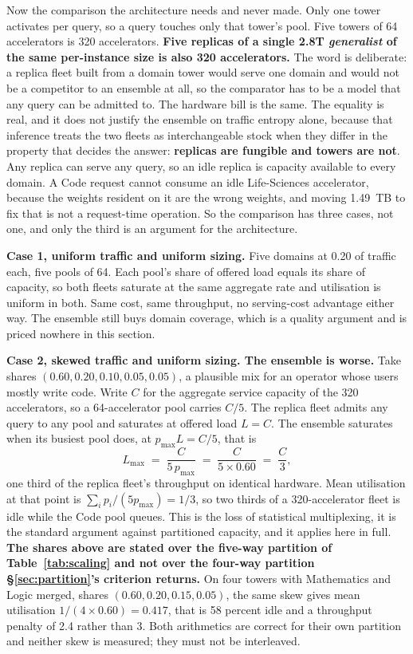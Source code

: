 \documentclass[11pt]{article}
\begin{document}
Now the comparison the architecture needs and never made. Only one tower activates per query, so a query touches only that tower's pool. Five towers of 64 accelerators is 320 accelerators. \textbf{Five replicas of a single 2.8T \emph{generalist} of the same per-instance size is also 320 accelerators.} The word is deliberate: a replica fleet built from a domain tower would serve one domain and would not be a competitor to an ensemble at all, so the comparator has to be a model that any query can be admitted to. The hardware bill is the same. The equality is real, and it does not justify the ensemble on traffic entropy alone, because that inference treats the two fleets as interchangeable stock when they differ in the property that decides the answer: \textbf{replicas are fungible and towers are not}. Any replica can serve any query, so an idle replica is capacity available to every domain. A Code request cannot consume an idle Life-Sciences accelerator, because the weights resident on it are the wrong weights, and moving 1.49~TB to fix that is not a request-time operation. So the comparison has three cases, not one, and only the third is an argument for the architecture.

\textbf{Case 1, uniform traffic and uniform sizing.} Five domains at 0.20 of traffic each, five pools of 64. Each pool's share of offered load equals its share of capacity, so both fleets saturate at the same aggregate rate and utilisation is uniform in both. Same cost, same throughput, no serving-cost advantage either way. The ensemble still buys domain coverage, which is a quality argument and is priced nowhere in this section.

\textbf{Case 2, skewed traffic and uniform sizing. The ensemble is worse.} Take shares $(0.60, 0.20, 0.10, 0.05, 0.05)$, a plausible mix for an operator whose users mostly write code. Write $C$ for the aggregate service capacity of the 320 accelerators, so a 64-accelerator pool carries $C/5$. The replica fleet admits any query to any pool and saturates at offered load $L = C$. The ensemble saturates when its busiest pool does, at $p_{\max}L = C/5$, that is
\[
L_{\max} \;=\; \frac{C}{5\,p_{\max}} \;=\; \frac{C}{5 \times 0.60} \;=\; \frac{C}{3},
\]
one third of the replica fleet's throughput on identical hardware. Mean utilisation at that point is $\sum_i p_i / (5 p_{\max}) = 1/3$, so two thirds of a 320-accelerator fleet is idle while the Code pool queues. This is the loss of statistical multiplexing, it is the standard argument against partitioned capacity, and it applies here in full. \textbf{The shares above are stated over the five-way partition of Table~\ref{tab:scaling} and not over the four-way partition \S\ref{sec:partition}'s criterion returns.} On four towers with Mathematics and Logic merged, shares $(0.60, 0.20, 0.15, 0.05)$, the same skew gives mean utilisation $1/(4\times0.60) = 0.417$, that is 58 percent idle and a throughput penalty of 2.4 rather than 3. Both arithmetics are correct for their own partition and neither skew is measured; they must not be interleaved.
\end{document}
